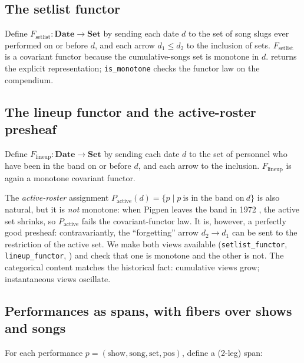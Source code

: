 \documentclass[
]{article}
\begin{document}
\subsection{The setlist functor}\label{the-setlist-functor}

Define \(F_{\text{setlist}} : \mathbf{Date} \to \mathbf{Set}\) by
sending each date \(d\) to the set of song slugs ever performed on or
before \(d\), and each arrow \(d_1 \le d_2\) to the inclusion of sets.
\(F_{\text{setlist}}\) is a covariant functor because the
cumulative-songs set is monotone in \(d\).
 returns the explicit
representation; \texttt{is\_monotone} checks the functor law on the
compendium.

\subsection{The lineup functor and the active-roster
presheaf}\label{the-lineup-functor-and-the-active-roster-presheaf}

Define \(F_{\text{lineup}} : \mathbf{Date} \to \mathbf{Set}\) by sending
each date \(d\) to the set of personnel who have been in the band on or
before \(d\), and each arrow to the inclusion. \(F_{\text{lineup}}\) is
again a monotone covariant functor.

The \emph{active-roster} assignment
\(P_{\text{active}}(d) = \{p \mid p\ \text{is
in the band on}\ d\}\) is also natural, but it is \emph{not} monotone:
when Pigpen leaves the band in 1972
\citep{ucr_lineup_changes, dead_net_official}, the active set shrinks,
so \(P_{\text{active}}\) fails the covariant-functor law. It is,
however, a perfectly good presheaf: contravariantly, the ``forgetting''
arrow \(d_2 \to d_1\) can be sent to the restriction of the active set.
We make both views available (\texttt{setlist\_functor},
\texttt{lineup\_functor}, ) and check
that one is monotone and the other is not. The categorical content
matches the historical fact: cumulative views grow; instantaneous views
oscillate.

\subsection{Performances as spans, with fibers over shows and
songs}\label{performances-as-spans-with-fibers-over-shows-and-songs}

For each performance
\(p = (\text{show}, \text{song}, \text{set}, \text{pos})\), define a
(2-leg) span:
\end{document}
